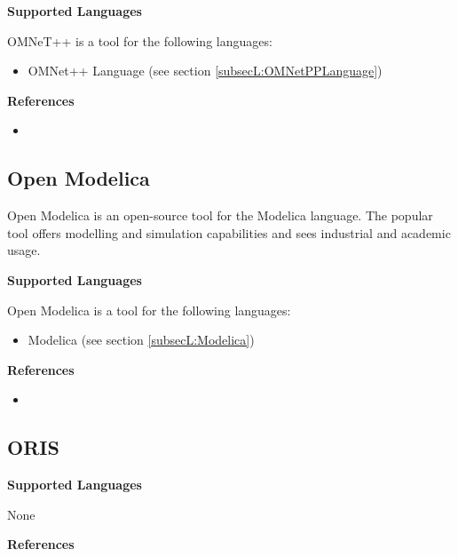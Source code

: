 \textbf{Supported Languages}

OMNeT++ is a tool for the following languages:
\begin{itemize}
	\item OMNet++ Language (see section \ref{subsecL:OMNetPPLanguage})
\end{itemize}


\textbf{References}
\begin{itemize}
	
\item {}
\end{itemize}



\subsection{Open Modelica}
\label{subsecT:OpenModelica}


Open Modelica is an open-source tool for the Modelica language. The popular tool offers modelling and simulation capabilities and sees industrial and academic usage.

\textbf{Supported Languages}

Open Modelica is a tool for the following languages:
\begin{itemize}
	\item Modelica (see section \ref{subsecL:Modelica})
\end{itemize}


\textbf{References}
\begin{itemize}
	
\item {}
\end{itemize}



\subsection{ORIS}
\label{subsecT:ORIS}



\textbf{Supported Languages}

None


\textbf{References}




